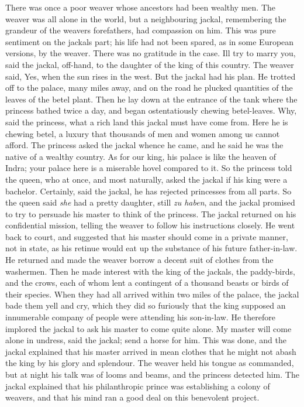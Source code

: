 \documentclass[14pt,a4paper]{memoir}
\begin{document}
There was once a poor weaver whose ancestors had been wealthy men. The
weaver was all alone in the world, but a neighbouring jackal,
\textquotesingle remembering the grandeur of the
weaver\textquotesingle s forefathers, had compassion on
him.\textquotesingle{} This was pure sentiment on the
jackal\textquotesingle s part; his life had not been spared, as in some
European versions, by the weaver. There was no gratitude in the case.
\textquotesingle I\textquotesingle ll try to marry
you,\textquotesingle{} said the jackal, off-hand, \textquotesingle to
the daughter of the king of this country.\textquotesingle{} The weaver
said, \textquotesingle Yes, when the sun rises in the
west.\textquotesingle{} But the jackal had his plan. He trotted off to
the palace, many miles away, and on the road he plucked quantities of
the leaves of the betel plant. Then he lay down at the entrance of the
tank where the princess bathed twice a day, and began ostentatiously
chewing betel-leaves. \textquotesingle Why,\textquotesingle{} said the
princess, \textquotesingle what a rich land this jackal must have come
from. Here he is chewing betel, a luxury that thousands of men and women
among us cannot afford.\textquotesingle{} The princess asked the jackal
whence he came, and he said he was the native of a wealthy country.
\textquotesingle As for our king, his palace is like the heaven of
Indra; your palace here is a miserable hovel compared to
it.\textquotesingle{} So the princess told the queen, who at once, and
most naturally, asked the jackal if his king were a bachelor.
\textquotesingle Certainly,\textquotesingle{} said the jackal,
\textquotesingle he has rejected princesses from all
parts.\textquotesingle{} So the queen said \emph{she} had a pretty
daughter, still \emph{zu haben}, and the jackal promised to try to
persuade his master to think of the princess. The jackal returned on his
confidential mission, telling the weaver to follow his instructions
closely. He went back to court, and suggested that his master should
come in a private manner, not in state, as his retinue would eat up the
substance of his future father-in-law. He returned and made the weaver
borrow a decent suit of clothes from the washermen. Then he made
interest with the king of the jackals, the paddy-birds, and the crows,
each of whom lent a contingent of a thousand beasts or birds of their
species. When they had all arrived within two miles of the palace, the
jackal bade them yell and cry, which they did so furiously that the king
supposed an innumerable company of people were attending his son-in-law.
He therefore implored the jackal to ask his master to come quite alone.
\textquotesingle My master will come alone in undress,\textquotesingle{}
said the jackal; \textquotesingle send a horse for
him.\textquotesingle{} This was done, and the jackal explained that his
master arrived in mean clothes that he might not abash the king by his
glory and splendour. The weaver held his tongue as commanded, but at
night his talk was of looms and beams, and the princess detected him.
The jackal explained that his philanthropic prince was establishing a
colony of weavers, and that his mind ran a good deal on this benevolent
project.
\end{document}
